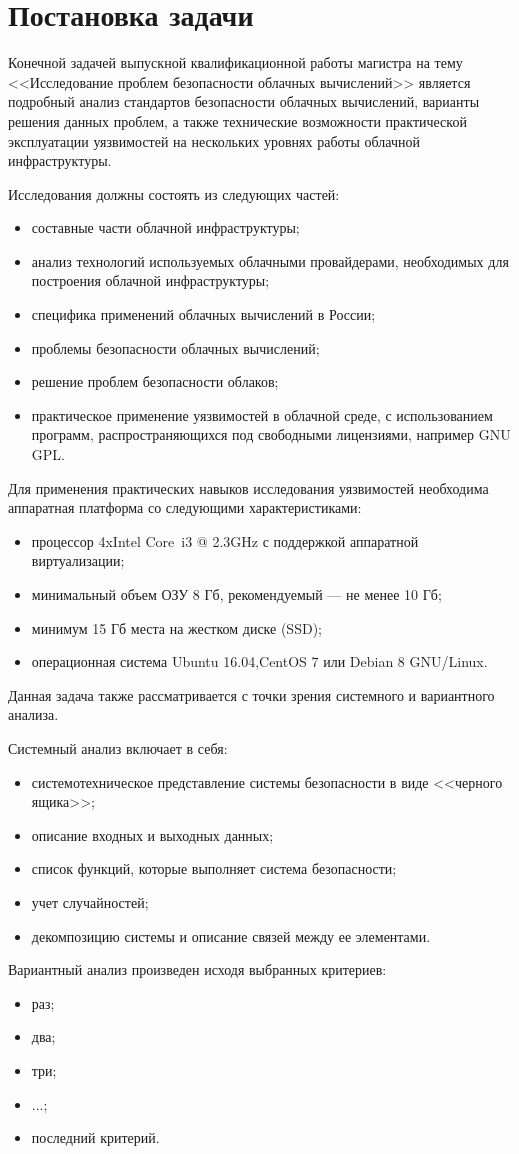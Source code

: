 \section{Постановка задачи}

Конечной задачей выпускной квалификационной работы магистра на тему <<Исследование проблем безопасности облачных вычислений>> является подробный анализ стандартов безопасности облачных вычислений, варианты решения данных проблем, а также технические возможности практической эксплуатации уязвимостей на нескольких уровнях работы облачной инфраструктуры.

Исследования должны состоять из следующих частей:
\begin{itemize}
  \item составные части облачной инфраструктуры;
  \item анализ технологий используемых облачными провайдерами, необходимых для построения облачной инфраструктуры;
  \item специфика применений облачных вычислений в России;
  \item проблемы безопасности облачных вычислений;
  \item решение проблем безопасности облаков;
  \item практическое применение уязвимостей в облачной среде, с использованием программ, распространяющихся под свободными лицензиями, например GNU GPL.
\end{itemize}

Для применения практических навыков исследования уязвимостей необходима аппаратная платформа со следующими характеристиками:
\begin{itemize}
  \item процессор 4xIntel Core\textregistered~i3 @ 2.3GHz с поддержкой аппаратной виртуализации;
  \item минимальный объем ОЗУ 8 Гб, рекомендуемый --- не менее 10 Гб;
  \item минимум 15 Гб места на жестком диске (SSD);
  \item операционная система Ubuntu 16.04,CentOS 7 или Debian 8 GNU/Linux.
\end{itemize}

Данная задача также рассматривается с точки зрения системного и вариантного анализа.

Системный анализ включает в себя: \cite{sys-analyz}
\begin{itemize}
  \item системотехническое представление системы безопасности в виде <<черного ящика>>;
  \item описание входных и выходных данных;
  \item список функций, которые выполняет система безопасности;
  \item учет случайностей;
  \item декомпозицию системы и описание связей между ее элементами.
\end{itemize}

Вариантный анализ произведен исходя выбранных критериев: \cite{var-analyz}
\begin{itemize}
  \item раз;
  \item два;
  \item три;
  \item ...;
  \item последний критерий.
\end{itemize}

\clearpage
